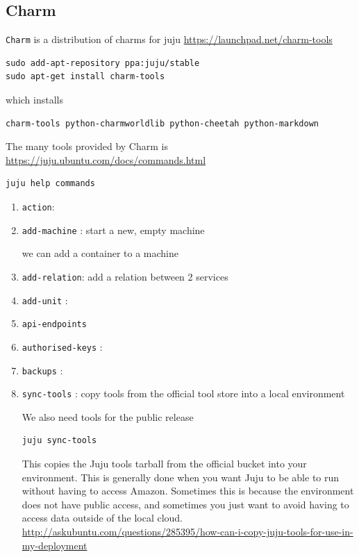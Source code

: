 \subsection{Charm}
\label{sec:Charm}

\verb!Charm! is a distribution of charms for juju
\url{https://launchpad.net/charm-tools}

\begin{verbatim}
sudo add-apt-repository ppa:juju/stable
sudo apt-get install charm-tools
\end{verbatim}
which installs
\begin{verbatim}
charm-tools python-charmworldlib python-cheetah python-markdown
\end{verbatim}

The many tools provided by Charm is
\url{https://juju.ubuntu.com/docs/commands.html}
\begin{verbatim}
juju help commands
\end{verbatim}

\begin{enumerate}
  \item \verb!action!:
  \item \verb!add-machine! : start a new, empty machine
  
  we can add a container to a machine
  \item \verb!add-relation!: add a relation between 2 services
  
  \item \verb!add-unit! : 
  
  \item \verb!api-endpoints! 
  
  \item \verb!authorised-keys! : 
  
  \item \verb!backups! : 
  
  \item \verb!sync-tools! : copy tools from the official tool store into a local
  environment

We also need tools for the public release 
\begin{verbatim}
juju sync-tools
\end{verbatim}
This copies the Juju tools tarball from the official bucket into your
environment. This is generally done when you want Juju to be able to run without
having to access Amazon.
Sometimes this is because the environment does not have public access, and
sometimes you just want to avoid having to access data outside of the local
cloud. 
\url{http://askubuntu.com/questions/285395/how-can-i-copy-juju-tools-for-use-in-my-deployment}


\end{enumerate}



